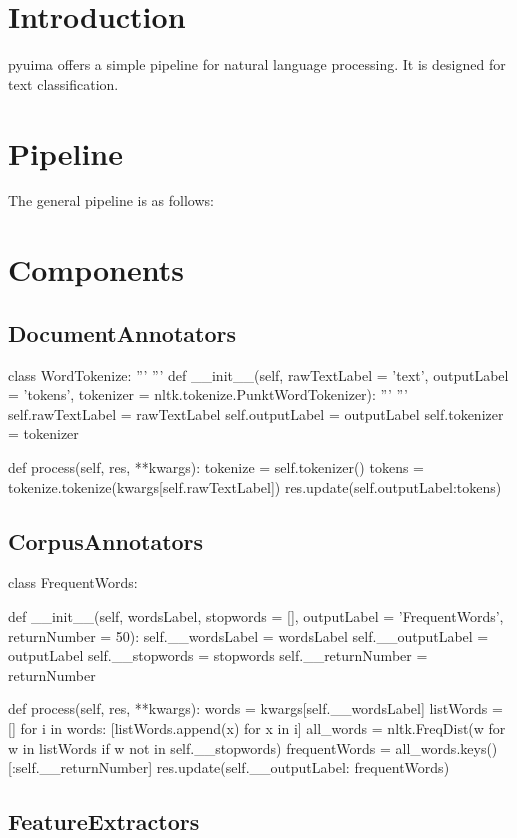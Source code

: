 \hypertarget{index_Introduction}{}\section{\-Introduction}\label{index_Introduction}
pyuima offers a simple pipeline for natural language processing. \-It is designed for text classification.\hypertarget{index_Pipeline}{}\section{\-Pipeline}\label{index_Pipeline}
\-The general pipeline is as follows\-:\hypertarget{index_Components}{}\section{\-Components}\label{index_Components}
\hypertarget{index_DocumentAnnotators}{}\subsection{\-Document\-Annotators}\label{index_DocumentAnnotators}

\begin{DoxyCode}
 class WordTokenize:
     '''
     '''
     def __init__(self, rawTextLabel = 'text', outputLabel = 'tokens',
                  tokenizer = nltk.tokenize.PunktWordTokenizer):
         '''
         '''
         self.rawTextLabel = rawTextLabel
         self.outputLabel = outputLabel
         self.tokenizer = tokenizer
         
     def process(self, res, **kwargs):
         tokenize = self.tokenizer()
         tokens = tokenize.tokenize(kwargs[self.rawTextLabel])
         res.update({self.outputLabel:tokens})
\end{DoxyCode}
\hypertarget{index_CorpusAnnotators}{}\subsection{\-Corpus\-Annotators}\label{index_CorpusAnnotators}

\begin{DoxyCode}
 class FrequentWords:
 
     def __init__(self, wordsLabel, stopwords = [], outputLabel = 
      'FrequentWords',
                  returnNumber = 50):
         self.__wordsLabel = wordsLabel
         self.__outputLabel = outputLabel
         self.__stopwords = stopwords
         self.__returnNumber = returnNumber
     
     def process(self, res, **kwargs):
         words = kwargs[self.__wordsLabel]
         listWords = []
         for i in words:
             [listWords.append(x) for x in i]
         all_words = nltk.FreqDist(w for w in listWords 
                                   if w not in self.__stopwords)
         frequentWords = all_words.keys()[:self.__returnNumber] 
         res.update({self.__outputLabel: frequentWords})
\end{DoxyCode}
\hypertarget{index_FeatureExtractors}{}\subsection{\-Feature\-Extractors}\label{index_FeatureExtractors}

